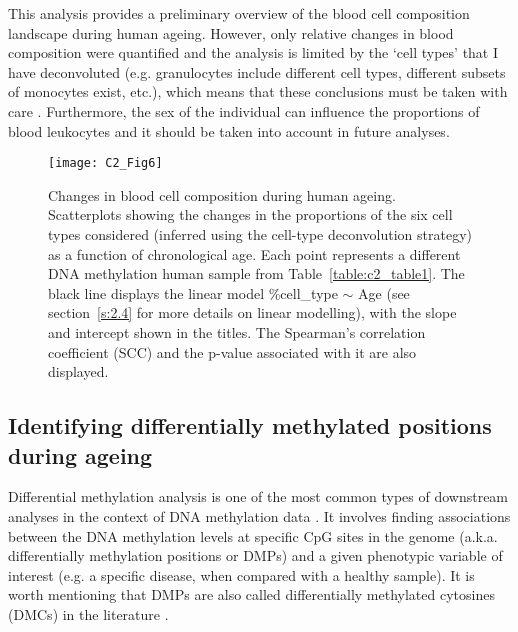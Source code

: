 \bigskip

This analysis provides a preliminary overview of the blood cell composition landscape during human ageing. However, only relative changes in blood composition were quantified and the analysis is limited by the `cell types' that I have deconvoluted (e.g. granulocytes include different cell types, different subsets of monocytes exist, etc.), which means that these conclusions must be taken with care \citep{Nikolich-Zugich2018}. Furthermore, the sex of the individual can influence the proportions of blood leukocytes \citep{Chen2016a} and it should be taken into account in future analyses. 

\begin{figure}[htbp!] 
	\centering    
	\texttt{[image: C2\_Fig6]}
	\caption[Changes in blood cell composition during human ageing]{Changes in blood cell composition during human ageing. Scatterplots showing the changes in the proportions of the six cell types considered (inferred using the cell-type deconvolution strategy) as a function of chronological age. Each point represents a different DNA methylation human sample from Table~\ref{table:c2_table1}. The black line displays the linear model \%cell\_type $\sim$ Age (see section~\ref{s:2.4} for more details on linear modelling), with the slope and intercept shown in the titles. The Spearman's correlation coefficient (\acrshort{SCC}) and the p-value associated with it are also displayed.}
	\label{fig:c2_fig6}
\end{figure}



\smallskip

\subsection{Identifying differentially methylated positions during ageing} \label{s:2.1.4}

\smallskip

Differential methylation analysis is one of the most common types of downstream analyses in the context of DNA methylation data \citep{Wilhelm-Benartzi2013,Morris2015,Teschendorff2018}. It involves finding associations between the DNA methylation levels at specific CpG sites in the genome (a.k.a. differentially methylation positions or \acrshort{DMPs}) and a given phenotypic variable of interest (e.g. a specific disease, when compared with a healthy sample). It is worth mentioning that DMPs are also called differentially methylated cytosines (\acrshort{DMCs}) in the literature \citep{Teschendorff2018}.


